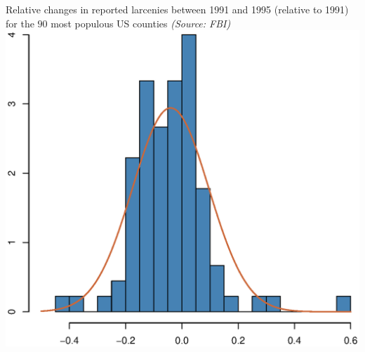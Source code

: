 \begin{slide}
\begin{block}{}
\begin{columns}
Relative changes in reported
larcenies between 1991 and 1995 (relative to 1991)
for the $90$ most populous US counties {\em (Source: FBI)}
\includegraphics[height=5truecm,width=5.3truecm]{figures/normdataplus}
\end{columns}
\end{block}
\end{slide}

